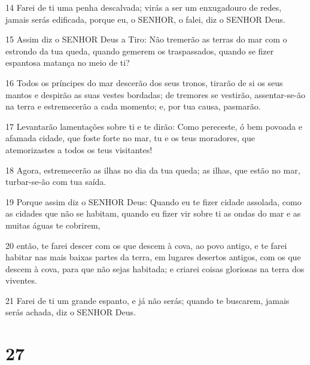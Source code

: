 \par 14 Farei de ti uma penha descalvada; virás a ser um enxugadouro de redes, jamais serás edificada, porque eu, o SENHOR, o falei, diz o SENHOR Deus.
\par 15 Assim diz o SENHOR Deus a Tiro: Não tremerão as terras do mar com o estrondo da tua queda, quando gemerem os traspassados, quando se fizer espantosa matança no meio de ti?
\par 16 Todos os príncipes do mar descerão dos seus tronos, tirarão de si os seus mantos e despirão as suas vestes bordadas; de tremores se vestirão, assentar-se-ão na terra e estremecerão a cada momento; e, por tua causa, pasmarão.
\par 17 Levantarão lamentações sobre ti e te dirão: Como pereceste, ó bem povoada e afamada cidade, que foste forte no mar, tu e os teus moradores, que atemorizastes a todos os teus visitantes!
\par 18 Agora, estremecerão as ilhas no dia da tua queda; as ilhas, que estão no mar, turbar-se-ão com tua saída.
\par 19 Porque assim diz o SENHOR Deus: Quando eu te fizer cidade assolada, como as cidades que não se habitam, quando eu fizer vir sobre ti as ondas do mar e as muitas águas te cobrirem,
\par 20 então, te farei descer com os que descem à cova, ao povo antigo, e te farei habitar nas mais baixas partes da terra, em lugares desertos antigos, com os que descem à cova, para que não sejas habitada; e criarei coisas gloriosas na terra dos viventes.
\par 21 Farei de ti um grande espanto, e já não serás; quando te buscarem, jamais serás achada, diz o SENHOR Deus.

\chapter{27}

